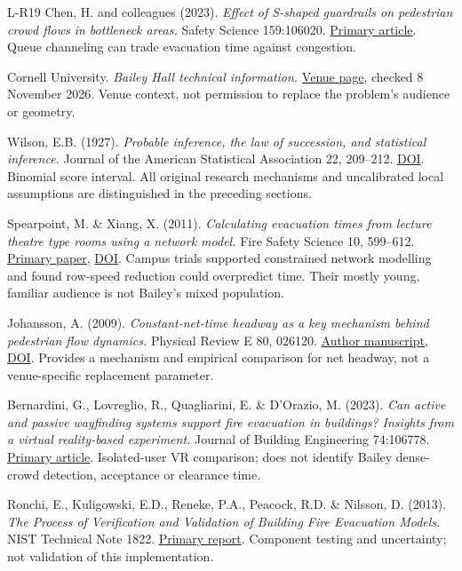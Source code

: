 \documentclass[11pt,a4paper]{article}
\begin{document}
\begin{thebibliography}{L-R19}
 Chen, H. and colleagues (2023). \emph{Effect of S-shaped guardrails on pedestrian crowd flows in bottleneck areas.} Safety Science 159:106020. \href{https://doi.org/10.1016/j.ssci.2022.106020}{Primary article}. Queue channeling can trade evacuation time against congestion.

 Cornell University. \emph{Bailey Hall technical information.} \href{https://scl.cornell.edu/get-involved/event-planning/bailey-hall/technical-information}{Venue page}, checked 8 November 2026. Venue context, not permission to replace the problem's audience or geometry.

 Wilson, E.B. (1927). \emph{Probable inference, the law of succession, and statistical inference.} Journal of the American Statistical Association 22, 209–212. \href{https://doi.org/10.1080/01621459.1927.10502953}{DOI}. Binomial score interval. All original research mechanisms and uncalibrated local assumptions are distinguished in the preceding sections.

 Spearpoint, M. \& Xiang, X. (2011). \emph{Calculating evacuation times from lecture theatre type rooms using a network model.} Fire Safety Science 10, 599–612. \href{https://publications.iafss.org/publications/fss/10/599/view}{Primary paper}, \href{https://doi.org/10.3801/IAFSS.FSS.10-599}{DOI}. Campus trials supported constrained network modelling and found row-speed reduction could overpredict time. Their mostly young, familiar audience is not Bailey's mixed population.

 Johansson, A. (2009). \emph{Constant-net-time headway as a key mechanism behind pedestrian flow dynamics.} Physical Review E 80, 026120. \href{https://arxiv.org/pdf/0908.3118}{Author manuscript}, \href{https://doi.org/10.1103/PhysRevE.80.026120}{DOI}. Provides a mechanism and empirical comparison for net headway, not a venue-specific replacement parameter.

 Bernardini, G., Lovreglio, R., Quagliarini, E. \& D'Orazio, M. (2023). \emph{Can active and passive wayfinding systems support fire evacuation in buildings? Insights from a virtual reality-based experiment.} Journal of Building Engineering 74:106778. \href{https://doi.org/10.1016/j.jobe.2023.106778}{Primary article}. Isolated-user VR comparison; does not identify Bailey dense-crowd detection, acceptance or clearance time.

 Ronchi, E., Kuligowski, E.D., Reneke, P.A., Peacock, R.D. \& Nilsson, D. (2013). \emph{The Process of Verification and Validation of Building Fire Evacuation Models.} NIST Technical Note 1822. \href{https://doi.org/10.6028/NIST.TN.1822}{Primary report}. Component testing and uncertainty; not validation of this implementation.


\end{thebibliography}
\end{document}
